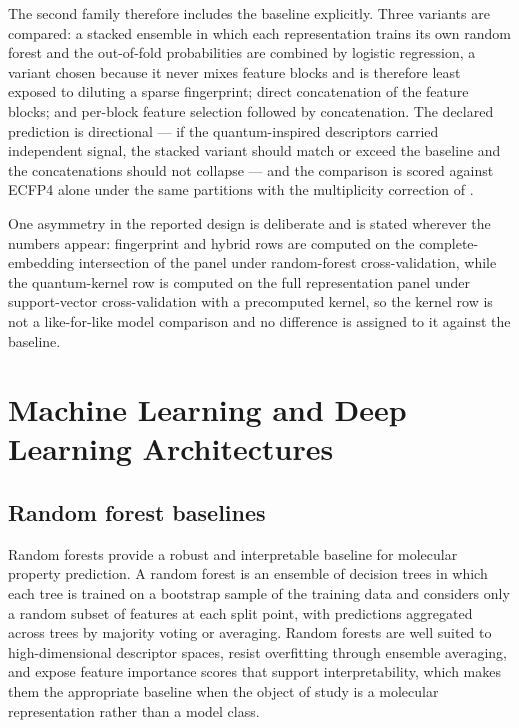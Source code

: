 The second family therefore includes the baseline explicitly. Three variants are compared: a stacked ensemble in which each representation trains its own random forest and the out-of-fold probabilities are combined by logistic regression, a variant chosen because it never mixes feature blocks and is therefore least exposed to diluting a sparse fingerprint; direct concatenation of the feature blocks; and per-block feature selection followed by concatenation. The declared prediction is directional --- if the quantum-inspired descriptors carried independent signal, the stacked variant should match or exceed the baseline and the concatenations should not collapse --- and the comparison is scored against ECFP4 alone under the same partitions with the multiplicity correction of .

One asymmetry in the reported design is deliberate and is stated wherever the numbers appear: fingerprint and hybrid rows are computed on the complete-embedding intersection of the panel under random-forest cross-validation, while the quantum-kernel row is computed on the full representation panel under support-vector cross-validation with a precomputed kernel, so the kernel row is not a like-for-like model comparison and no difference is assigned to it against the baseline.

\section{Machine Learning and Deep Learning Architectures}\label{sec:ml_methods}

\subsection{Random forest baselines}

Random forests provide a robust and interpretable baseline for molecular property prediction. A random forest is an ensemble of decision trees in which each tree is trained on a bootstrap sample of the training data and considers only a random subset of features at each split point, with predictions aggregated across trees by majority voting or averaging. Random forests are well suited to high-dimensional descriptor spaces, resist overfitting through ensemble averaging, and expose feature importance scores that support interpretability, which makes them the appropriate baseline when the object of study is a molecular representation rather than a model class.

